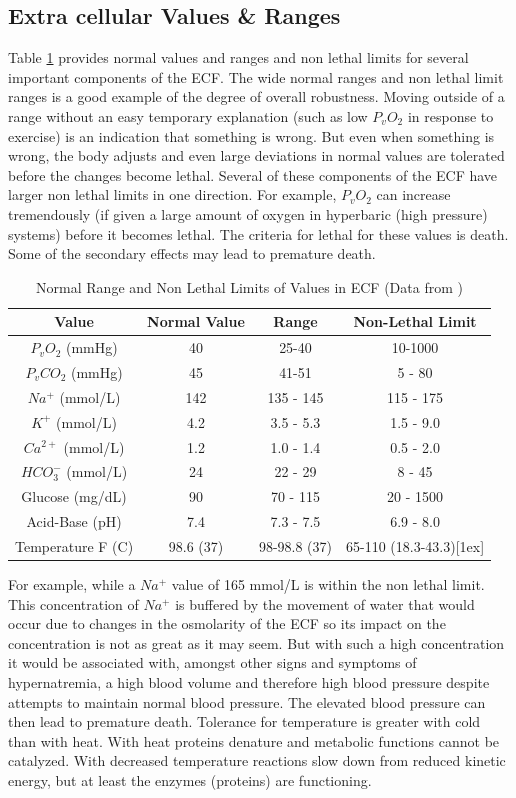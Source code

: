 \subsection{Extra cellular Values \& Ranges}

Table \ref{table:ecf_value_ranges} provides normal values and ranges and non lethal limits for several important components of the ECF.  The wide normal ranges and non lethal limit ranges is a good example of the degree of overall robustness. Moving outside of a range without an easy temporary explanation (such as low $P_v O_2$ in response to exercise) is an indication that something is wrong. But even when something is wrong, the body adjusts and even large deviations in normal values are tolerated before the changes become lethal. Several of these components of the ECF have larger non lethal limits in one direction. For example, $P_v O_2$ can increase tremendously (if given a large amount of oxygen in hyperbaric (high pressure) systems) before it becomes lethal. The criteria for lethal for these values is death. Some of the secondary effects may lead to premature death. 

\begin{table}[h!]
\centering
\begin{tabular}{||c c c c||} 
 \hline
Value & Normal Value & Range & Non-Lethal Limit\\ [0.5ex] 
 \hline\hline
 $P_v O_2$ (mmHg) & 40  & 25-40 & 10-1000 \\
 $P_v CO_2$ (mmHg) & 45 & 41-51 & 5 - 80\\ 
 $Na^+$ (mmol/L) & 142 & 135 - 145 & 115 - 175\\
 $K^+$  (mmol/L) & 4.2 & 3.5 - 5.3 & 1.5 - 9.0\\ 
 $Ca^{2+}$ (mmol/L) & 1.2 & 1.0 - 1.4 & 0.5 - 2.0 \\
 $HCO_3 ^-$ (mmol/L)& 24 & 22 - 29 & 8 - 45 \\
 Glucose (mg/dL)& 90 & 70 - 115 & 20 - 1500 \\
 Acid-Base (pH) & 7.4 & 7.3 - 7.5 & 6.9 - 8.0 \\
 Temperature F (C) & 98.6 (37) & 98-98.8 (37) & 65-110 (18.3-43.3)[1ex] 
 \hline
\end{tabular}
\caption{Normal Range and Non Lethal Limits of Values in ECF (\footnotesize{Data from \cite{feher_quantitative_2017}})}
\label{table:ecf_value_ranges}
\end{table}

For example, while a $Na^+$ value of 165 mmol/L is within the non lethal limit. This concentration of $Na^+$ is buffered by the movement of water that would occur due to changes in the osmolarity of the ECF so its impact on the concentration is not as great as it may seem. But with such a high concentration it would be associated with, amongst other signs and symptoms of hypernatremia, a high blood volume and therefore high blood pressure despite attempts to maintain normal blood pressure. The elevated blood pressure can then lead to premature death.  Tolerance for temperature is greater with cold than with heat. With heat proteins denature and metabolic functions cannot be catalyzed. With decreased temperature reactions slow down from reduced kinetic energy, but at least the enzymes (proteins) are functioning. 


